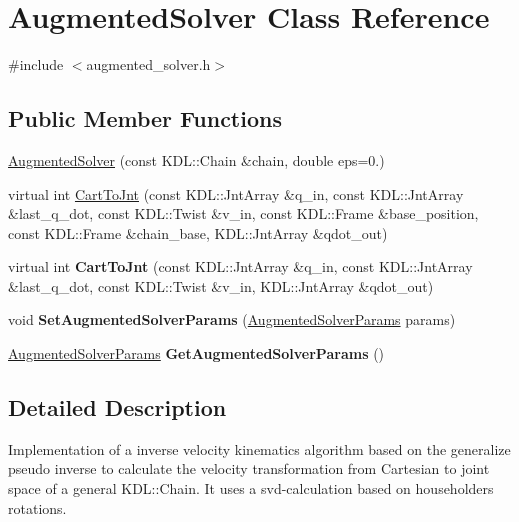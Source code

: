 \hypertarget{classAugmentedSolver}{\section{Augmented\-Solver Class Reference}
\label{classAugmentedSolver}
}


{\ttfamily \#include $<$augmented\-\_\-solver.\-h$>$}

\subsection*{Public Member Functions}
\begin{DoxyCompactItemize}
\item 
\hyperlink{classAugmentedSolver_a35d52c13881a84cc466a0690b606dceb}{Augmented\-Solver} (const K\-D\-L\-::\-Chain \&chain, double eps=0.)
\item 
virtual int \hyperlink{classAugmentedSolver_a9e0bf7d41497a64341b113b91c2c2011}{Cart\-To\-Jnt} (const K\-D\-L\-::\-Jnt\-Array \&q\-\_\-in, const K\-D\-L\-::\-Jnt\-Array \&last\-\_\-q\-\_\-dot, const K\-D\-L\-::\-Twist \&v\-\_\-in, const K\-D\-L\-::\-Frame \&base\-\_\-position, const K\-D\-L\-::\-Frame \&chain\-\_\-base, K\-D\-L\-::\-Jnt\-Array \&qdot\-\_\-out)
\item 
\hypertarget{classAugmentedSolver_a18a1deb97750840a0419b9e7fc63e9c6}{virtual int {\bfseries Cart\-To\-Jnt} (const K\-D\-L\-::\-Jnt\-Array \&q\-\_\-in, const K\-D\-L\-::\-Jnt\-Array \&last\-\_\-q\-\_\-dot, const K\-D\-L\-::\-Twist \&v\-\_\-in, K\-D\-L\-::\-Jnt\-Array \&qdot\-\_\-out)}\label{classAugmentedSolver_a18a1deb97750840a0419b9e7fc63e9c6}

\item 
\hypertarget{classAugmentedSolver_a5f9c96640a7ba94846971afde8d7708b}{void {\bfseries Set\-Augmented\-Solver\-Params} (\hyperlink{structAugmentedSolverParams}{Augmented\-Solver\-Params} params)}\label{classAugmentedSolver_a5f9c96640a7ba94846971afde8d7708b}

\item 
\hypertarget{classAugmentedSolver_a011b617df37cb359ca65e15549a344ca}{\hyperlink{structAugmentedSolverParams}{Augmented\-Solver\-Params} {\bfseries Get\-Augmented\-Solver\-Params} ()}\label{classAugmentedSolver_a011b617df37cb359ca65e15549a344ca}

\end{DoxyCompactItemize}


\subsection{Detailed Description}
Implementation of a inverse velocity kinematics algorithm based on the generalize pseudo inverse to calculate the velocity transformation from Cartesian to joint space of a general K\-D\-L\-::\-Chain. It uses a svd-\/calculation based on householders rotations. 

